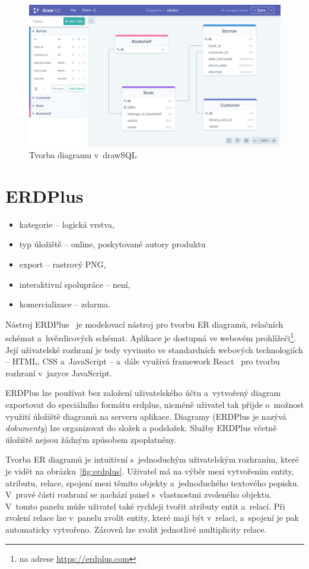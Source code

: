 \begin{figure}
  \centering
  \includegraphics[width = \textwidth]{../img/drawsql.png}
  \caption{Tvorba diagramu v~drawSQL}
  \label{fig:drawsql}
\end{figure}

\section{ERDPlus}
\begin{itemize}
  \item kategorie -- logická vrstva,
  \item typ úložiště -- online, poskytované autory produktu
  \item export -- rastrový PNG,
  \item interaktivní spolupráce -- není,
  \item komercializace -- zdarma.
\end{itemize}

Nástroj ERDPlus~\cite{erdplus21} je modelovací nástroj pro tvorbu ER diagramů,
relačních schémat a~hvězdicových schémat. Aplikace je dostupná ve webovém
prohlížeči\footnote{na adrese \url{https://erdplus.com}}. Její uživatelské
rozhraní je tedy vyvinuto ve standardních webových technologiích -- HTML, CSS
a~JavaScript -- a~dále využívá framework React~\cite{react2021} pro tvorbu
rozhraní v~jazyce JavaScript.

ERDPlus lze používat bez založení uživatelského účtu a~vytvořený diagram
exportovat do speciálního formátu erdplus, nicméně uživatel tak přijde o~možnost
využití úložiště diagramů na serveru aplikace. Diagramy (ERDPlus je nazývá
\emph{dokumenty}) lze organizovat do složek a podsložek. Služby ERDPlus včetně
úložiště nejsou žádným způsobem zpoplatněny.

Tvorba ER diagramů je intuitivní s~jednoduchým uživatelským rozhraním, které je
vidět na obrázku~\ref{fig:erdplus}. Uživatel má na výběr mezi vytvořením entity,
atributu, relace, spojení mezi těmito objekty a~jednoduchého textového popisku.
V~pravé části rozhraní se nachází panel s~vlastnostmi zvoleného objektu. V~tomto
panelu může uživatel také rychleji tvořit atributy entit a~relací. Při zvolení
relace lze v~panelu zvolit entity, které mají být v~relaci, a~spojení je pak
automaticky vytvořeno. Zároveň lze zvolit jednotlivé multiplicity relace.

